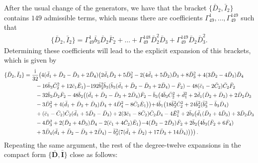 \documentclass[10pt]{amsart}
\theoremstyle{definition}
\theoremstyle{corollary}
\theoremstyle{remark}
\theoremstyle{conclusion}
\begin{document}
After the usual change of the generators, we have that the bracket $\{\bar{D}_2,\bar{I}_2\}$ contains $149$ admissible terms, which means there are  coefficients $\Gamma_{49}^1 ,\ldots , \Gamma_{49}^{149}$ such that  
\begin{align*}
    \{\bar{D}_2,\bar{I}_2\} = \Gamma_{49}^1 \bar{b}_3 \bar{D}_2 \bar{F}_2 + \ldots + \Gamma_{49}^{148}   \bar{D}_2^2  \bar{D}_3+ \Gamma_{49}^{149}  \bar{D}_2     \bar{D}_3^2.
\end{align*} 
Determining these coefficients will lead to the explicit expansion of this brackets, which is given by 
\begin{align}
    \{\bar{D}_2, \bar{I}_2\}&=\frac{{\rm i}}{32}\bigl( 4(\bar{d}_1+\bar{D}_2-\bar{D}_3+2\bar{D}_4)\bigl( 2 \bar{d}_1 \bar{D}_2+5\bar{D}_2^2-2(4 \bar{d}_1 +5 \bar{D}_2)\bar{D}_3+8\bar{D}_3^2+4(3\bar{D}_2-4\bar{D}_3)\bar{D}_4 \nonumber \\
& \hskip 0.7 cm -16 \bar{b}_3 \bar{C}_2^2+12 \bar{c}_1 \bar{E}_1	\bigl)-192 \bar{b}_2^2 \bar{b}_3(\bar{b}_3(\bar{d}_1+\bar{D}_2-\bar{D}_3+2\bar{D}_4)-\bar{F}_2)-48(\bar{c}_1-2\bar{C}_2)\bar{C}_2\bar{F}_2 \nonumber \\
& \hskip 0.7 cm -32\bar{b}_3\bar{D}_2\bar{F}_2-48 \bar{b}_2\bigl((\bar{d}_1+\bar{D}_2-\bar{D}_3+2\bar{D}_4)\bar{F}_2-\bar{b}_3 \bigl(4 \bar{b}_3 \bar{C}_2^2+\bar{d}_1^2+2\bar{d}_1(\bar{D}_2+\bar{D}_3)+2\bar{D}_2 \bar{D}_3  \nonumber \\
& \hskip 0.7 cm-3\bar{D}_3^2 +4(\bar{d}_1+\bar{D}_2+\bar{D}_3)\bar{D}_4+4\bar{D}_4^2-8 \bar{C}_2 \bar{E}_1\bigl) \bigl)+4 \bar{b}_1\bigl( 18 \bar{b}_3^2 \bar{C}_2^2+24 \bar{b}_2^2(\bar{b}_3^3-\bar{b}_3 \bar{D}_4) \nonumber \\
& \hskip 0.7 cm+(\bar{c}_1-\bar{C}_2)\bar{C}_2(\bar{d}_1+5\bar{D}_2-\bar{D}_3)+2(3\bar{c}_1-8\bar{C}_2)\bar{C}_2\bar{D}_4-4\bar{E}_1^2+2\bar{b}_3\bigl( \bar{d}_1(\bar{D}_2+4\bar{D}_3)+3\bar{D}_2 \bar{D}_3  \nonumber \\
& \hskip 0.7 cm-4\bar{D}_3^2+2(\bar{D}_2+4\bar{D}_3) \bar{D}_4-2(\bar{c}_1+4\bar{C}_2)\bar{E}_1\bigl)-4(\bar{D}_2-2\bar{D}_3)\bar{F}_2+2\bar{b}_2 \bigl(4\bar{b}_3(\bar{F}_2+6\bar{F}_4)  \nonumber \\
& \hskip 0.7 cm+3 \bar{D}_4(\bar{d}_1+\bar{D}_2-\bar{D}_3+2\bar{D}_4)-\bar{b}_3^2(7(\bar{d}_1+\bar{D}_2)+17 \bar{D}_3+14 \bar{D}_4)\bigl)\bigl)\bigl) \, .
\end{align} 
 Repeating the same argument, the rest of the  degree-twelve expansions in the compact form $\{\bar{\textbf{D}},\bar{\textbf{I}}\}$ close as follows:
\end{document}
